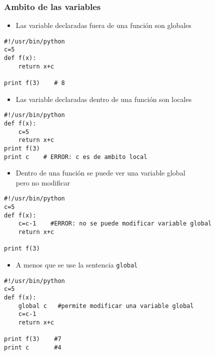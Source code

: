 \begin{frame}[fragile]
\frametitle{Ambito de las variables}
\begin{itemize}
\item 
Las variable declaradas fuera de una función son globales
\end{itemize}
  \begin{footnotesize}
\begin{verbatim}
#!/usr/bin/python
c=5
def f(x):
    return x+c

print f(3)    # 8
\end{verbatim}
  \end{footnotesize}

\begin{itemize}
\item 
Las variable declaradas dentro de una función son locales
\end{itemize}

  \begin{footnotesize}
\begin{verbatim}
#!/usr/bin/python
def f(x):
    c=5
    return x+c
print f(3)
print c    # ERROR: c es de ambito local
\end{verbatim}
  \end{footnotesize}




\begin{itemize}
\item 
Dentro de una función se puede ver una variable global\\
pero no modificar
\end{itemize}
  \begin{footnotesize}
\begin{verbatim}
#!/usr/bin/python
c=5
def f(x):
    c=c-1    #ERROR: no se puede modificar variable global
    return x+c
    
print f(3)
\end{verbatim}
  \end{footnotesize}

\end{frame}


\begin{frame}[fragile]

\begin{itemize}
\item 
A menos que se use la sentencia \verb|global|
\end{itemize}



  \begin{footnotesize}
\begin{verbatim}
#!/usr/bin/python
c=5
def f(x):
    global c   #permite modificar una variable global
    c=c-1   
    return x+c
    
print f(3)    #7
print c       #4
\end{verbatim}
  \end{footnotesize}


\end{frame}


